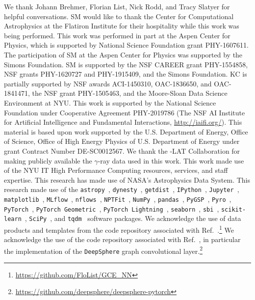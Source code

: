 \documentclass[prd,aps,10pt,nofootinbib,twocolumn,superscriptaddress,preprintnumbers,balancelastpage,longbibliography]{revtex4-1}
\begin{document}
\begin{acknowledgments}

We thank Johann Brehmer, Florian List, Nick Rodd, and Tracy Slatyer for helpful conversations. 
SM would like to thank the Center for Computational Astrophysics at the Flatiron Institute for their hospitality while this work was being performed. 
This work was performed in part at the Aspen Center for Physics, which is supported by National Science Foundation grant PHY-1607611.
The participation of SM at the Aspen Center for Physics was supported by the Simons Foundation.
SM is supported by the NSF CAREER grant PHY-1554858, NSF grants PHY-1620727 and PHY-1915409, and the Simons Foundation. 
KC is partially supported by NSF awards ACI-1450310, OAC-1836650, and OAC-1841471, the NSF grant PHY-1505463, and the Moore-Sloan Data Science Environment at NYU. 
This work is supported by the National Science Foundation under Cooperative Agreement PHY-2019786 (The NSF AI Institute for Artificial Intelligence and Fundamental Interactions, \url{http://iaifi.org/}).
This material is based upon work supported by the U.S. Department of Energy, Office of Science, Office of High Energy Physics of U.S. Department of Energy under grant Contract Number DE-SC0012567.
We thank the \Fermi-LAT Collaboration for making publicly available the $\gamma$-ray data used in this work.
This work made use of the NYU IT High Performance Computing resources, services, and staff expertise. 
This research has made use of NASA's Astrophysics Data System. 
This research made use of the \texttt{astropy}~\cite{Price-Whelan:2018hus,Robitaille:2013mpa}, \texttt{dynesty}~\cite{Speagle_2020}, \texttt{getdist}~\cite{Lewis:2019xzd}, \texttt{IPython}~\cite{PER-GRA:2007}, \texttt{Jupyter}~\cite{Kluyver2016JupyterN}, \texttt{matplotlib}~\cite{Hunter:2007}, \texttt{MLflow}~\cite{chen2020developments}, \texttt{nflows}~\cite{nflows}, \texttt{NPTFit}~\cite{Mishra-Sharma:2016gis}, \texttt{NumPy}~\cite{harris2020array}, \texttt{pandas}~\cite{pandas:2010}, \texttt{PyGSP}~\cite{michael_defferrard_2017_1003158}, \texttt{Pyro}~\cite{bingham2018pyro}, \texttt{PyTorch}~\cite{NEURIPS2019_9015}, \texttt{PyTorch Geometric}~\cite{Fey/Lenssen/2019}, \texttt{PyTorch Lightning}~\cite{william_falcon_2020_3828935}, \texttt{seaborn}~\cite{seaborn}, \texttt{sbi}~\cite{tejero-cantero2020sbi}, \texttt{scikit-learn}~\cite{scikit-learn}, \texttt{SciPy}~\cite{2020SciPy-NMeth}, and \texttt{tqdm}~\cite{da2019tqdm} software packages. We acknowledge the use of data products and templates from the code repository associated with Ref.~\cite{List:2020mzd}.\footnote{\url{https://github.com/FloList/GCE_NN}} 
We acknowledge the use of the code repository associated with Ref.~\cite{defferrard2020deepsphere}, in particular the implementation of the \texttt{DeepSphere} graph convolutional layer.\footnote{\url{https://github.com/deepsphere/deepsphere-pytorch}}
\end{acknowledgments}



\end{document}
